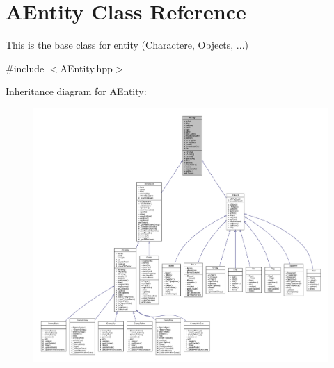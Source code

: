 \hypertarget{class_a_entity}{}\section{A\+Entity Class Reference}
\label{class_a_entity}


This is the base class for entity (Charactere, Objects, ...)  




{\ttfamily \#include $<$A\+Entity.\+hpp$>$}



Inheritance diagram for A\+Entity\+:
\nopagebreak
\begin{figure}[H]
\begin{center}
\leavevmode
\includegraphics[width=350pt]{class_a_entity__inherit__graph}
\end{center}
\end{figure}


